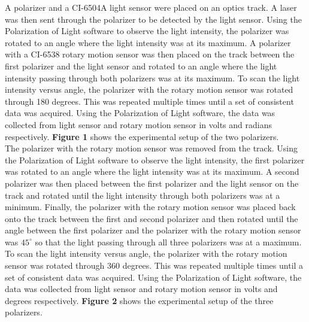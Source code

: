 \documentclass[
	letterpaper, %
	10pt, %
]{CSUniSchoolLabReport}
\begin{document}
A polarizer and a CI-6504A light sensor were placed on an optics track. A laser was then sent through the polarizer
to be detected by the light sensor. Using the Polarization of Light software to observe the light intensity, the
polarizer was rotated to an angle where the light intensity was at its maximum. A polarizer with a CI-6538 rotary
motion sensor was then placed on the track between the first polarizer and the light sensor and rotated to an angle
where the light intensity passing through both polarizers was at its maximum. To scan the light intensity versus
angle, the polarizer with the rotary motion sensor was rotated through 180 degrees. This was repeated multiple
times until a set of consistent data was acquired. Using the Polarization of Light software, the data was collected
from light sensor and rotary motion sensor in volts and radians respectively. \textbf{Figure 1} shows the experimental
setup of the two polarizers.\\

The polarizer with the rotary motion sensor was removed from the track. Using the Polarization of Light software to
observe the light intensity, the first polarizer was rotated to an angle where the light intensity was at its maximum.
A second polarizer was then placed between the first polarizer and the light sensor on the track and rotated until
the light intensity through both polarizers was at a minimum. Finally, the polarizer with the rotary motion sensor
was placed back onto the track between the first and second polarizer and then rotated until the angle between the
first polarizer and the polarizer with the rotary motion sensor was $45^\circ$ so that the light passing through
all three polarizers was at a maximum. To scan the light intensity versus angle, the polarizer with the rotary
motion sensor was rotated through 360 degrees. This was repeated multiple times until a set of consistent data
was acquired. Using the Polarization of Light software, the data was collected from light sensor and rotary
motion sensor in volts and degrees respectively. \textbf{Figure 2} shows the experimental setup of the three polarizers.
\end{document}

